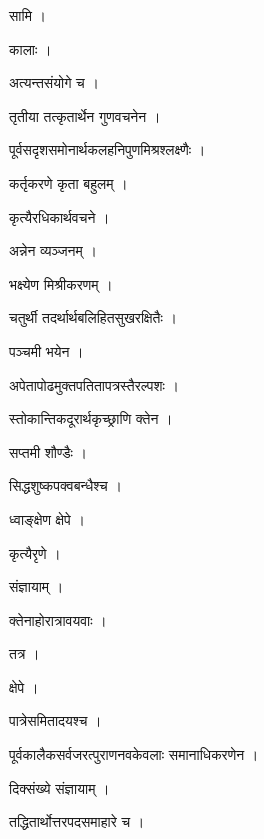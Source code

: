 \documentclass[10pt, openany]{book}
\begin{document}
\noindent सामि ।

\noindent कालाः ।

\noindent अत्यन्तसंयोगे च ।

\noindent तृतीया तत्कृतार्थेन गुणवचनेन ।

\noindent पूर्वसदृशसमोनार्थकलहनिपुणमिश्रश्लक्ष्णैः ।

\noindent कर्तृकरणे कृता बहुलम् ।

\noindent कृत्यैरधिकार्थवचने ।

\noindent अन्नेन व्यञ्जनम् ।

\noindent भक्ष्येण मिश्रीकरणम् ।

\noindent चतुर्थी तदर्थार्थबलिहितसुखरक्षितैः ।

\noindent पञ्चमी भयेन ।

\noindent अपेतापोढमुक्तपतितापत्रस्तैरल्पशः ।

\noindent स्तोकान्तिकदूरार्थकृच्छ्राणि क्तेन ।

\noindent सप्तमी शौण्डैः ।

\noindent सिद्धशुष्कपक्वबन्धैश्च ।

\noindent ध्वाङ्क्षेण क्षेपे ।

\noindent कृत्यैरृणे ।

\noindent संज्ञायाम् ।

\noindent क्तेनाहोरात्रावयवाः ।

\noindent तत्र ।

\noindent क्षेपे ।

\noindent पात्रेसमितादयश्च ।

\noindent पूर्वकालैकसर्वजरत्पुराणनवकेवलाः समानाधिकरणेन ।

\noindent दिक्संख्ये संज्ञायाम् ।

\noindent तद्धितार्थोत्तरपदसमाहारे च ।
\end{document}
